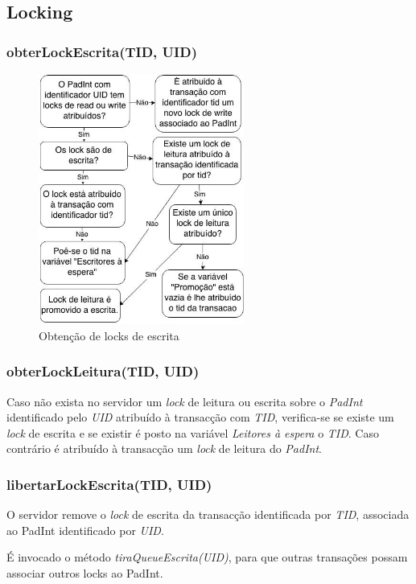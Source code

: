 \subsection{Locking}

\subsubsection{obterLockEscrita(TID, UID)}

\begin{figure}[H]
\centering
\includegraphics[width=6.75cm]{obtem_lock_w.jpg}
\caption{Obtenção de locks de escrita}
\end{figure}

\subsubsection{obterLockLeitura(TID, UID)}
Caso não exista no servidor um \textit{lock} de leitura ou escrita sobre o \textit{PadInt} identificado pelo \textit{UID} atribuído à transacção com \textit{TID}, verifica-se se existe um \textit{lock} de escrita e se existir é posto na variável \textit{Leitores à espera} o \textit{TID}. Caso contrário é atribuído à transacção um \textit{lock} de leitura do \textit{PadInt}.

\subsubsection{libertarLockEscrita(TID, UID)}

O servidor remove o \textit{lock} de escrita da transacção identificada por \textit{TID}, associada ao PadInt identificado por \textit{UID}.

É invocado o método \textit{tiraQueueEscrita(UID)}, para que outras transações possam associar outros locks ao PadInt.

